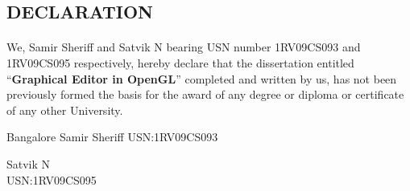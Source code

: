 \documentclass[12pt]{report}
\begin{document}
\begin{titlepage}
\begin{center}
\section*{DECLARATION}
\end{center}

\paragraph{}  We, Samir Sheriff and Satvik N bearing USN number 1RV09CS093 and 1RV09CS095 respectively, hereby declare that the dissertation entitled ``\textbf{Graphical Editor in OpenGL}'' completed and written by us, has not been previously formed the basis for the award of any degree or diploma or certificate of any other University.
\vspace{1in}

\begin{flushright} {Bangalore \hspace{4.4in} Samir Sheriff } 
 {USN:1RV09CS093}
 \end{flushright}

\begin{flushright} { Satvik N } \\
 {USN:1RV09CS095}
 \end{flushright}
\end{titlepage}
%
\end{document}
